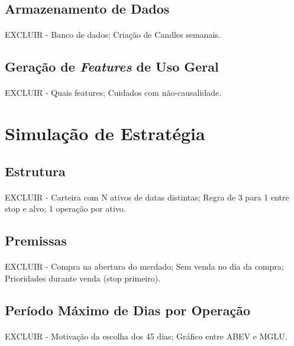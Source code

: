 \subsection{Armazenamento de Dados}
\paragraph{} EXCLUIR - Banco de dados; Criação de Candles semanais.



\subsection{Geração de \textit{Features} de Uso Geral}
\paragraph{} EXCLUIR - Quais features; Cuidados com não-causalidade.


\section{Simulação de Estratégia}

\subsection{Estrutura}
\paragraph{} EXCLUIR - Carteira com N ativos de datas distintas; Regra de 3 para 1 entre stop e alvo; 1 operação por ativo.

\subsection{Premissas}
\paragraph{} EXCLUIR - Compra na abertura do merdado; Sem venda no dia da compra; Prioridades durante venda (stop primeiro).

\subsection{Período Máximo de Dias por Operação}
\paragraph{} EXCLUIR - Motivação da escolha dos 45 dias; Gráfico entre ABEV e MGLU.


